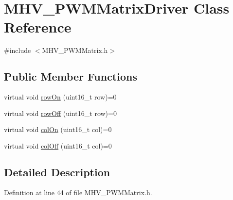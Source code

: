 \hypertarget{class_m_h_v___p_w_m_matrix_driver}{\section{M\-H\-V\-\_\-\-P\-W\-M\-Matrix\-Driver Class Reference}
\label{class_m_h_v___p_w_m_matrix_driver}
}


{\ttfamily \#include $<$M\-H\-V\-\_\-\-P\-W\-M\-Matrix.\-h$>$}

\subsection*{Public Member Functions}
\begin{DoxyCompactItemize}
\item 
virtual void \hyperlink{class_m_h_v___p_w_m_matrix_driver_a29010e47aae4f8fd18062be2a3e36aa7}{row\-On} (uint16\-\_\-t row)=0
\item 
virtual void \hyperlink{class_m_h_v___p_w_m_matrix_driver_ab1ebb00f0b24bc73c209cf543c38d9ed}{row\-Off} (uint16\-\_\-t row)=0
\item 
virtual void \hyperlink{class_m_h_v___p_w_m_matrix_driver_a3f5060e28a17075891a46ccf5dc0445a}{col\-On} (uint16\-\_\-t col)=0
\item 
virtual void \hyperlink{class_m_h_v___p_w_m_matrix_driver_a654484d86d2111713f82c30b87780348}{col\-Off} (uint16\-\_\-t col)=0
\end{DoxyCompactItemize}


\subsection{Detailed Description}


Definition at line 44 of file M\-H\-V\-\_\-\-P\-W\-M\-Matrix.\-h.



